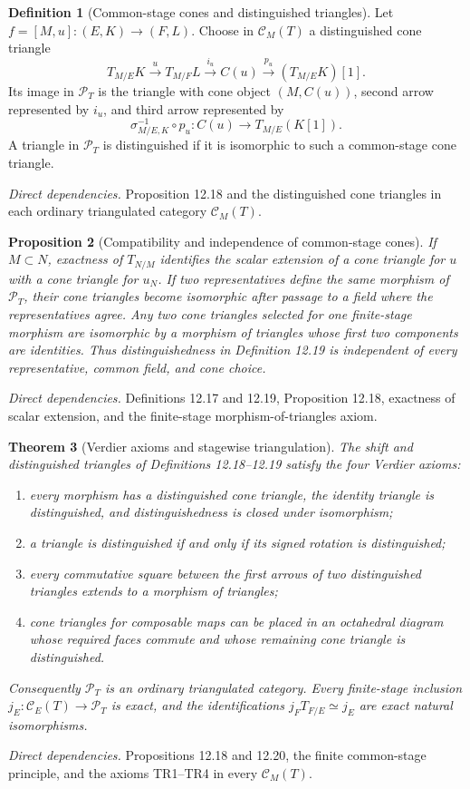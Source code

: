 \documentclass[10pt]{article}
\newtheorem{theorem}{Theorem}[section]
\newtheorem{proposition}[theorem]{Proposition}
\theoremstyle{definition}
\newtheorem{definition}[theorem]{Definition}
\newcommand{\deps}[1]{\par\smallskip\textit{Direct dependencies.} #1\par}
\begin{document}
\begin{definition}[Common-stage cones and distinguished triangles]
Let $f=[M,u]:(E,K)\to(F,L)$.  Choose in $\mathcal C_M(T)$ a distinguished
cone triangle
\[
 T_{M/E}K\xrightarrow{u}T_{M/F}L
 \xrightarrow{i_u}C(u)\xrightarrow{p_u}(T_{M/E}K)[1].
\]
Its image in $\mathcal P_T$ is the triangle with cone object $(M,C(u))$,
second arrow represented by $i_u$, and third arrow represented by
\[
 \sigma_{M/E,K}^{-1}\circ p_u:
 C(u)\longrightarrow T_{M/E}(K[1]).
\]
A triangle in $\mathcal P_T$ is distinguished if it is isomorphic to such
a common-stage cone triangle.
\end{definition}
\deps{Proposition 12.18 and the distinguished cone triangles in each
ordinary triangulated category $\mathcal C_M(T)$.}

\begin{proposition}[Compatibility and independence of common-stage cones]
If $M\subset N$, exactness of $T_{N/M}$ identifies the scalar extension of
a cone triangle for $u$ with a cone triangle for $u_N$.  If two
representatives define the same morphism of $\mathcal P_T$, their cone
triangles become isomorphic after passage to a field where the
representatives agree.  Any two cone triangles selected for one
finite-stage morphism are isomorphic by a morphism of triangles whose first
two components are identities.  Thus distinguishedness in Definition
12.19 is independent of every representative, common field, and cone
choice.
\end{proposition}
\deps{Definitions 12.17 and 12.19, Proposition 12.18, exactness of scalar
extension, and the finite-stage morphism-of-triangles axiom.}

\begin{theorem}[Verdier axioms and stagewise triangulation]
The shift and distinguished triangles of Definitions 12.18--12.19 satisfy
the four Verdier axioms:
\begin{enumerate}
\item every morphism has a distinguished cone triangle, the identity
triangle is distinguished, and distinguishedness is closed under
isomorphism;
\item a triangle is distinguished if and only if its signed rotation is
distinguished;
\item every commutative square between the first arrows of two
distinguished triangles extends to a morphism of triangles;
\item cone triangles for composable maps can be placed in an octahedral
diagram whose required faces commute and whose remaining cone triangle is
distinguished.
\end{enumerate}
Consequently $\mathcal P_T$ is an ordinary triangulated category.  Every
finite-stage inclusion $j_E:\mathcal C_E(T)\to\mathcal P_T$ is exact, and
the identifications $j_FT_{F/E}\simeq j_E$ are exact natural
isomorphisms.
\end{theorem}
\deps{Propositions 12.18 and 12.20, the finite common-stage principle, and
the axioms TR1--TR4 in every $\mathcal C_M(T)$.}
\end{document}
